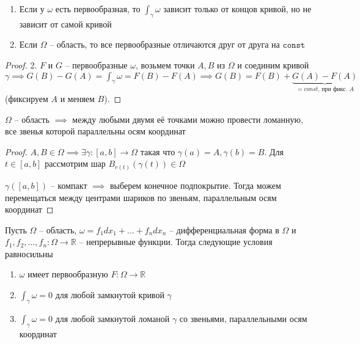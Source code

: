 \begin{consequence}
    \begin{enumerate}
        \item Если у $\omega$ есть первообразная, то $\int_{\gamma}^{}\omega$ зависит только от концов кривой, но не зависит от самой кривой
        \item Если $\Omega$ -- область, то все первообразные отличаются друг от друга на $\texttt{const}$
    \end{enumerate}
\end{consequence}

\begin{proof}
    \item[2.] $F$ и $G$ -- первообразные $\omega$, возьмем точки $A, B$ из $\Omega$ и соединим кривой $\gamma \implies G(B) - G(A) = \int_{\gamma}^{}\omega = F(B) - F(A) \implies G(B) = F(B) + \underbrace{G(A) - F(A)}_{=const \text{, при фикс. } A}$ (фиксируем $A$ и меняем $B$).
\end{proof}

\begin{lemma}
    $\Omega$ -- область $\implies$ между любыми двумя её точками можно провести ломанную, все звенья которой параллельны осям координат

\end{lemma}

\begin{proof}
    $A, B \in \Omega \implies \exists \gamma: [a, b] \to \Omega$ такая что $\gamma(a) = A, \gamma(b) = B$. Для $t \in [a, b]$ рассмотрим шар $B_{r(t)}(\gamma(t)) \in \Omega$
    

    $\gamma([a, b])$ -- компакт $\implies$ выберем конечное подпокрытие. Тогда можем перемещаться между центрами шариков по звеньям, параллельным осям координат

\end{proof}

\begin{theorem}
    Пусть $\Omega$ -- область, $\omega = f_1dx_1 + \dots + f_ndx_n$ -- дифференциальная форма в $\Omega$ и $f_1, f_2, \dots, f_n: \Omega \to \mathbb{R}$ -- непрерывные функции. Тогда следующие условия равносильны

    \begin{enumerate}
        \item $\omega$ имеет первообразную $F: \Omega \to \mathbb{R}$
        \item $\int_{\gamma}^{}\omega = 0$ для любой замкнутой кривой $\gamma$
        \item $\int_{\gamma}^{}\omega = 0$ для любой замкнутой ломаной $\gamma$ со звеньями, параллельными осям координат
    \end{enumerate}
\end{theorem}

